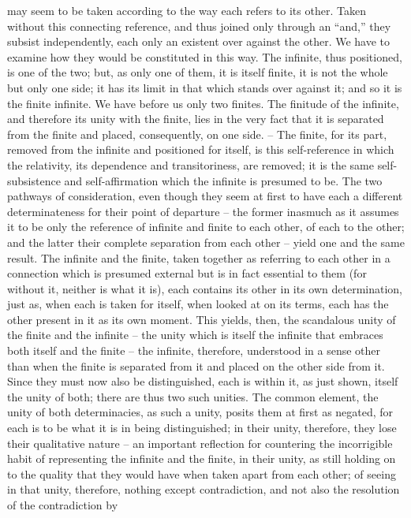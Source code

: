 may seem to be taken according to the way each refers to its other. Taken
without this connecting reference, and thus joined only through an “and,”
they subsist independently, each only an existent over against the other.
We have to examine how they would be constituted in this way. The
infinite, thus positioned, is one of the two; but, as only one of them, it
is itself finite, it is not the whole but only one side; it has its limit in
that which stands over against it; and so it is the finite infinite. We have
before us only two finites. The finitude of the infinite, and therefore its
unity with the finite, lies in the very fact that it is separated from the finite
and placed, consequently, on one side. – The finite, for its part, removed
from the infinite and positioned for itself, is this self-reference in which the
relativity, its dependence and transitoriness, are removed; it is the same
self-subsistence and self-affirmation which the infinite is presumed to be.
The two pathways of consideration, even though they seem at first to
have each a different determinateness for their point of departure – the
former inasmuch as it assumes it to be only the reference of infinite and
finite to each other, of each to the other; and the latter their complete
separation from each other – yield one and the same result. The infinite
and the finite, taken together as referring to each other in a connection
which is presumed external but is in fact essential to them (for without it,
neither is what it is), each contains its other in its own determination, just
as, when each is taken for itself, when looked at on its terms, each has the
other present in it as its own moment.
This yields, then, the scandalous unity of the finite and the infinite –
the unity which is itself the infinite that embraces both itself and the
finite – the infinite, therefore, understood in a sense other than when the
finite is separated from it and placed on the other side from it. Since they
must now also be distinguished, each is within it, as just shown, itself
the unity of both; there are thus two such unities. The common element,
the unity of both determinacies, as such a unity, posits them at first as
negated, for each is to be what it is in being distinguished; in their unity,
therefore, they lose their qualitative nature – an important reflection for
countering the incorrigible habit of representing the infinite and the finite,
in their unity, as still holding on to the quality that they would have when
taken apart from each other; of seeing in that unity, therefore, nothing
except contradiction, and not also the resolution of the contradiction by
